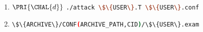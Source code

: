 

\begin{enumerate}
\item \DESCTASKIMPL
      {$\PRI{\CHAL{d}}$}
      {\mbox{\lstinline[language={bash}]|./attack \$\{USER\}.T \$\{USER\}.conf|}}
\item \DESCTASKEXAM
      {\mbox{\lstinline[language={bash}]|\$\{ARCHIVE\}/CONF(ARCHIVE_PATH,CID)/\$\{USER\}.exam|}}
\end{enumerate}

